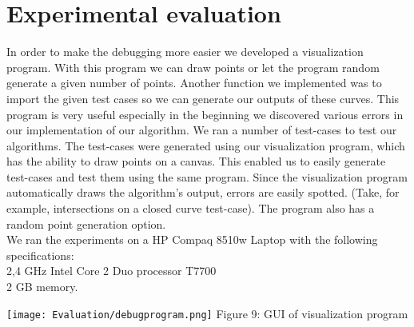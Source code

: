\chapter{Experimental evaluation}
\label{sec:Evaluation}
In order to make the debugging more easier we developed a visualization program. With this program we can draw points or let the program random generate a given number of points. Another function we implemented was to import the given test cases so we can generate our outputs of these curves. This program is very useful especially in the beginning we discovered various errors in our implementation of our algorithm.
We ran a number of test-cases to test our algorithms. The test-cases were generated using our visualization program, which has the ability to draw points on a canvas. This enabled us to easily generate test-cases and test them using the same program. Since the visualization program automatically draws the algorithm's output, errors are easily spotted. (Take, for example, intersections on a closed curve test-case). The program also has a random point generation option.\\
We ran the experiments on a HP Compaq 8510w Laptop with the following specifications:\\
2,4 GHz Intel Core 2 Duo processor T7700\\
2 GB memory.

\begin{center}
\texttt{[image: Evaluation/debugprogram.png]}
Figure 9: GUI of visualization program
\end{center}